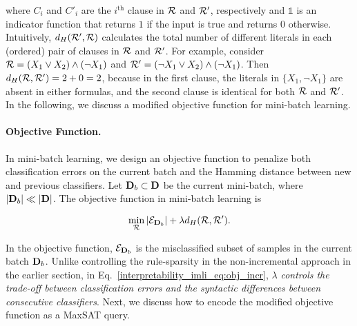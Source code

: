  where $ C_i $ and $ C'_i $ are the $ i^\text{th} $ clause in $ {\mathcal{R}} $ and $ {\mathcal{R}}' $, respectively and $ \mathds{1} $ is an indicator function that returns $ 1 $ if the input is true and returns $ 0 $ otherwise.  Intuitively, $ d_{H}({\mathcal{R}}', {\mathcal{R}}) $ calculates the total number of different literals in each (ordered) pair of clauses in $ {\mathcal{R}} $  and $ {\mathcal{R}}' $.  For example, consider $ {\mathcal{R}} = (X_1 \vee X_2) \wedge (\neg X_1) $ and $ {\mathcal{R}}' = (\neg X_1 \vee X_2) \wedge (\neg X_1) $. Then $ 	d_{H}({\mathcal{R}}, {\mathcal{R}}') = 2 + 0 = 2 $, because in the first clause, the  literals in $ \{X_1, \neg X_1\} $ are absent in either formulas, and the second clause is identical for both $ {\mathcal{R}} $ and $ {\mathcal{R}}' $. In the following, we discuss a modified objective function for mini-batch learning.



\paragraph{Objective Function.}
\label{interpretability_imli_sec:obj_incremental}
In mini-batch learning, we design an objective function to penalize both classification errors on the current batch and the Hamming distance between new and previous classifiers. Let $ \mathbf{D}_b \subset \mathbf{D} $ be the current mini-batch, where $ |\mathbf{D}_b| \ll |\mathbf{D}| $. The objective function in mini-batch learning is




\begin{align}
\label{interpretability_imli_eq:obj_incr}
\min_{{\mathcal{R}}} |\mathcal{E}_{\mathbf{D}_b}|+\lambda d_{H}({\mathcal{R}}, {\mathcal{R}}').
\end{align}

In the objective function, $ \mathcal{E}_{\mathbf{D}_b} $ is the misclassified subset of samples in the current batch $ \mathbf{D}_b $. Unlike controlling the rule-sparsity in the non-incremental approach in the earlier section, in Eq.~\eqref{interpretability_imli_eq:obj_incr}, $ \lambda $ \emph{controls the trade-off between classification errors and the syntactic differences between consecutive classifiers}. Next, we discuss how to encode the modified objective function as a MaxSAT query. 
 

